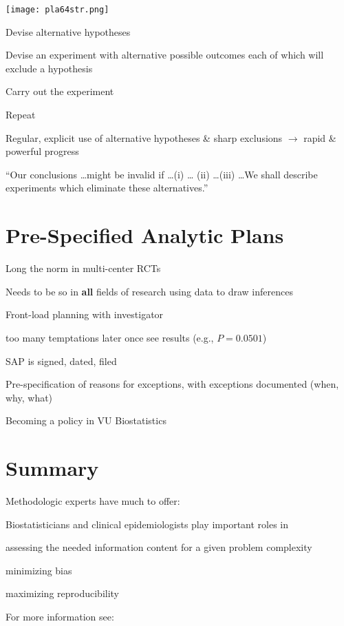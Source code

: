 \texttt{[image: pla64str.png]}

\citet{pla64str}

\bi
\item Devise alternative hypotheses
\item Devise an experiment with alternative possible outcomes each of
which will exclude a hypothesis
\item Carry out the experiment
\item Repeat
\item Regular, explicit use of alternative hypotheses \& sharp
exclusions $\rightarrow$ rapid \& powerful progress
\item ``Our conclusions \ldots might be invalid if \ldots (i) \ldots
(ii) \ldots (iii) \ldots We shall describe experiments which eliminate
these alternatives.''\cite{pla64str}
\ei


\section{Pre-Specified Analytic Plans}

\bi
\item Long the norm in multi-center RCTs
\item Needs to be so in \textbf{all} fields of research using data to
draw inferences~\cite{rub07des}
\item Front-load planning with investigator
 \bi
 \item too many temptations later once see results (e.g., $P=0.0501$)
 \ei
\item SAP is signed, dated, filed
\item Pre-specification of reasons for exceptions, with exceptions
documented (when, why, what)
\item Becoming a policy in VU Biostatistics
\ei


\section{Summary}
Methodologic experts have much to offer:
\bi
\item Biostatisticians and clinical epidemiologists play important
roles in
 \bi
 \item assessing the needed information content for a given problem
   complexity
 \item minimizing bias
 \item maximizing reproducibility
 \ei
\item For more information see:
\bi
\item {}
\item {}
\item {}
\ei
\ei

